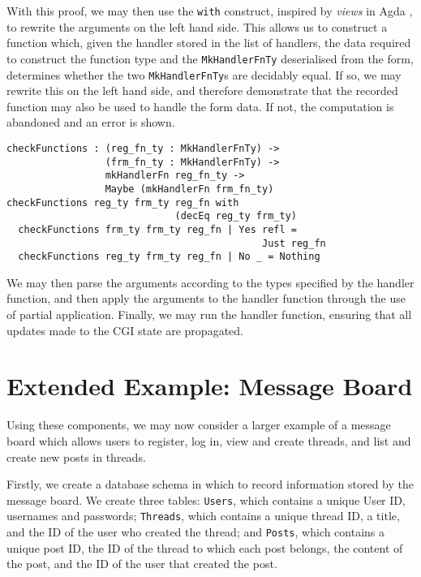 \documentclass[preprint]{sigplanconf}
\begin{document}
With this proof, we may then use the \texttt{with} construct, inspired by \textit{views} in Agda \cite{mcbride.mckinna:viewfromleft}, to rewrite the arguments on the left hand side. This allows us to construct a function which, given the handler stored in the list of handlers, the data required to construct the function type and the \texttt{MkHandlerFnTy} deserialised from the form, determines whether the two \texttt{MkHandlerFnTy}s are decidably equal. If so, we may rewrite this on the left hand side, and therefore demonstrate that the recorded function may also be used to handle the form data. If not, the computation is abandoned and an error is shown. %
\begin{Verbatim}
checkFunctions : (reg_fn_ty : MkHandlerFnTy) -> 
                 (frm_fn_ty : MkHandlerFnTy) -> 
                 mkHandlerFn reg_fn_ty -> 
                 Maybe (mkHandlerFn frm_fn_ty)
checkFunctions reg_ty frm_ty reg_fn with 
                             (decEq reg_ty frm_ty)
  checkFunctions frm_ty frm_ty reg_fn | Yes refl = 
                                            Just reg_fn
  checkFunctions reg_ty frm_ty reg_fn | No _ = Nothing
\end{Verbatim}
We may then parse the arguments according to the types specified by the handler function, and then apply the arguments to the handler function through the use of partial application. Finally, we may run the handler function, ensuring that all updates made to the CGI state are propagated.


\section{Extended Example: Message Board}
\label{messageboard}
Using these components, we may now consider a larger example of a message board which allows users to register, log in, view and create threads, and list and create new posts in threads. 

Firstly, we create a database schema in which to record information stored by the message board. We create three tables: \texttt{Users}, which contains a unique User ID, usernames and passwords; \texttt{Threads}, which contains a unique thread ID, a title, and the ID of the user who created the thread; and \texttt{Posts}, which contains a unique post ID, the ID of the thread to which each post belongs, the content of the post, and the ID of the user that created the post.
\end{document}
